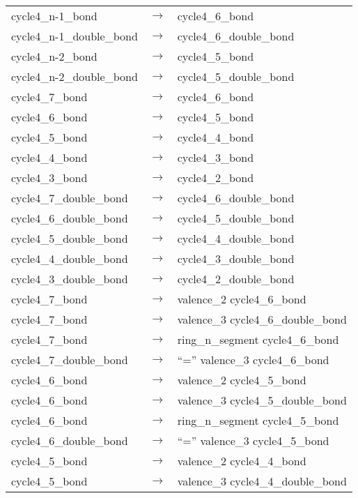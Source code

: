 \documentclass[../Document.tex]{subfiles}
\begin{document}
\begin{longtable}{m{} p{} p{}}
    cycle4\_n-1\_bond & $\rightarrow$ & cycle4\_6\_bond \\
    cycle4\_n-1\_double\_bond & $\rightarrow$ & cycle4\_6\_double\_bond \\
    cycle4\_n-2\_bond & $\rightarrow$ & cycle4\_5\_bond \\
    cycle4\_n-2\_double\_bond & $\rightarrow$ & cycle4\_5\_double\_bond \\
    cycle4\_7\_bond & $\rightarrow$ & cycle4\_6\_bond \\
    cycle4\_6\_bond & $\rightarrow$ & cycle4\_5\_bond \\
    cycle4\_5\_bond & $\rightarrow$ & cycle4\_4\_bond \\
    cycle4\_4\_bond & $\rightarrow$ & cycle4\_3\_bond \\
    cycle4\_3\_bond & $\rightarrow$ & cycle4\_2\_bond \\
    cycle4\_7\_double\_bond & $\rightarrow$ & cycle4\_6\_double\_bond \\
    cycle4\_6\_double\_bond & $\rightarrow$ & cycle4\_5\_double\_bond \\
    cycle4\_5\_double\_bond & $\rightarrow$ & cycle4\_4\_double\_bond \\
    cycle4\_4\_double\_bond & $\rightarrow$ & cycle4\_3\_double\_bond \\
    cycle4\_3\_double\_bond & $\rightarrow$ & cycle4\_2\_double\_bond \\
    cycle4\_7\_bond & $\rightarrow$ & valence\_2 cycle4\_6\_bond \\
    cycle4\_7\_bond & $\rightarrow$ & valence\_3 cycle4\_6\_double\_bond \\
    cycle4\_7\_bond & $\rightarrow$ & ring\_n\_segment cycle4\_6\_bond \\
    cycle4\_7\_double\_bond & $\rightarrow$ & ``='' valence\_3 cycle4\_6\_bond \\
    cycle4\_6\_bond & $\rightarrow$ & valence\_2 cycle4\_5\_bond \\
    cycle4\_6\_bond & $\rightarrow$ & valence\_3 cycle4\_5\_double\_bond \\
    cycle4\_6\_bond & $\rightarrow$ & ring\_n\_segment cycle4\_5\_bond \\
    cycle4\_6\_double\_bond & $\rightarrow$ & ``='' valence\_3 cycle4\_5\_bond \\
    cycle4\_5\_bond & $\rightarrow$ & valence\_2 cycle4\_4\_bond \\
    cycle4\_5\_bond & $\rightarrow$ & valence\_3 cycle4\_4\_double\_bond \\

\end{longtable}
\end{document}
